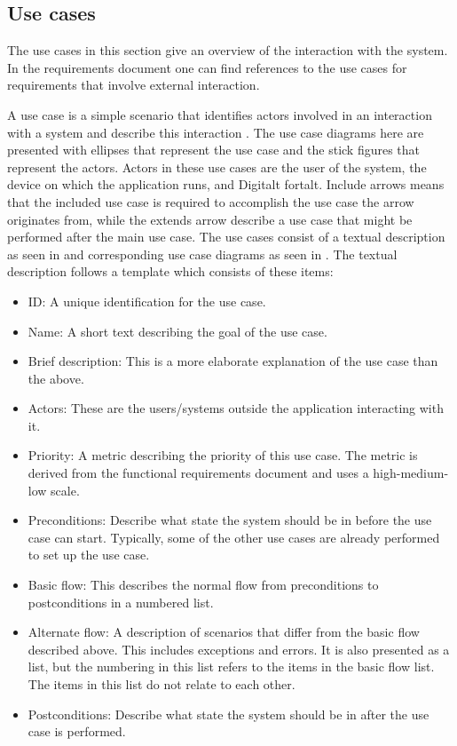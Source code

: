 \subsection{Use cases}
\label{subsec:use_cases}

The use cases in this section give an overview of the interaction with the system. In the requirements document one can find references to the use cases for requirements that involve external interaction.\newline

A use case is a simple scenario that identifies actors involved in an interaction with a system and describe this interaction \cite[p.106-107]{Sommerville}. The use case diagrams here are presented with ellipses that represent the use case and the stick figures that represent the actors. Actors in these use cases are the user of the system, the device on which the application runs, and Digitalt fortalt. Include arrows means that the included use case is required to accomplish the use case the arrow originates from, while the extends arrow describe a use case that might be performed after the main use case. The use cases consist of a textual description as seen in \textbf{} and corresponding use case diagrams as seen in \textbf{}. The textual description follows a template which consists of these items:
\begin{itemize}
\item ID: A unique identification for the use case.
\item Name: A short text describing the goal of the use case.
\item Brief description: This is a more elaborate explanation of the use case than the above.
\item Actors: These are the users/systems outside the application interacting with it.
\item Priority: A metric describing the priority of this use case. The metric is derived from the functional requirements document and uses a high-medium-low scale.
\item Preconditions: Describe what state the system should be in before the use case can start. Typically, some of the other use cases are already performed to set up the use case.
\item Basic flow: This describes the normal flow from preconditions to postconditions in a numbered list.
\item Alternate flow: A description of scenarios that differ from the basic flow described above. This includes exceptions and errors. It is also presented as a list, but the numbering in this list refers to the items in the basic flow list. The items in this list do not relate to each other.
\item Postconditions: Describe what state the system should be in after the use case is performed.
\end{itemize}
